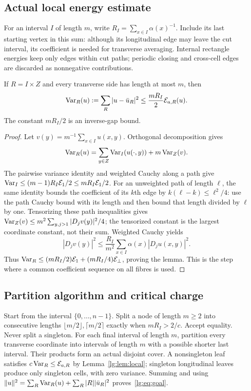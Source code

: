 \subsection{Actual local energy estimate}
For an interval $I$ of length $m$, write
$R_I=\sum_{x\in I}\alpha(x)^{-1}$. Include its last starting vertex in
this sum: although its longitudinal edge may leave the cut interval, its
coefficient is needed for transverse averaging. Internal rectangle energies
keep only edges within cut paths; periodic closing and cross-cell edges
are discarded as nonnegative contributions.

\begin{lemma}\label{lg:lem:local}
If $R=I\times Z$ and every transverse side has length at most $m$, then
\begin{equation}\label{lg:eq:local}
 \operatorname{Var}_R(u):=\sum_R|u-\bar u_R|^2\le\frac{mR_I}{2}\mathcal E_{a,R}(u).
\end{equation}
The constant $mR_I/2$ is an inverse-gap bound.
\end{lemma}
\begin{proof}
Let $v(y)=m^{-1}\sum_{x\in I}u(x,y)$. Orthogonal decomposition gives
\[
 \operatorname{Var}_R(u)=\sum_{y\in Z}\operatorname{Var}_I(u(\cdot,y))+m\operatorname{Var}_Z(v).
\]
The pairwise variance identity and weighted Cauchy along a path give
$\operatorname{Var}_I\le(m-1)R_I\mathcal E_1/2\le mR_I\mathcal E_1/2$.
For an unweighted path of length $\ell$, the same identity bounds the
coefficient of its $k$th edge by $k(\ell-k)\le\ell^2/4$:
use the path Cauchy bound with its length and then bound that length
divided by $\ell$ by one. Tensorizing these path inequalities gives
$\operatorname{Var}_Z(v)\le m^2\sum_{y,j>1}|D_jv(y)|^2/4$; the tensorized constant
is the largest coordinate constant, not their sum. Weighted Cauchy yields
\[
 |D_jv(y)|^2\le\frac{R_I}{m^2}
      \sum_{x\in I}\alpha(x)|D_ju(x,y)|^2.
\]
Thus $\operatorname{Var}_R\le(mR_I/2)\mathcal E_1+(mR_I/4)\mathcal E_\perp$, proving the lemma.
This is the step where a common coefficient sequence on all fibres is used.
\end{proof}

\subsection{Partition algorithm and critical charge}
Start from the interval $\{0,\ldots,n-1\}$. Split a node of length $m\ge2$
into consecutive lengths $\lfloor m/2\rfloor,\lceil m/2\rceil$ exactly
when $mR_I>2/c$. Accept equality. Never split a singleton. For each final
interval of length $m$, partition every transverse coordinate into intervals
of length $m$ with a possible shorter last interval. Their products form
an actual disjoint cover. A nonsingleton leaf satisfies
$c\operatorname{Var}_R\le\mathcal E_{a,R}$ by Lemma~\ref{lg:lem:local}; singleton longitudinal
leaves produce only singleton cells, with zero variance. Summing and using
$\|u\|^2=\sum_R\operatorname{Var}_R(u)+\sum_R|R||\bar u_R|^2$ proves~\eqref{lg:eq:goal}.

